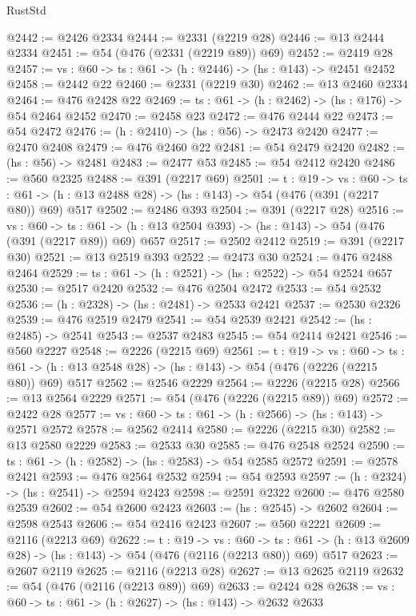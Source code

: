 \begin{lexlean}{RustStd}
\begin{coremodule}
@2442 := @2426 @2334
@2444 := @2331 (@2219 @28)
@2446 := @13 @2444 @2334
@2451 := @54 (@476 (@2331 (@2219 @89)) @69)
@2452 := @2419 @28
@2457 := {vs : @60} -> {ts : @61} -> (h : @2446) -> (hs : @143) -> @2451 @2452
@2458 := @2442 @22
@2460 := @2331 (@2219 @30)
@2462 := @13 @2460 @2334
@2464 := @476 @2428 @22
@2469 := {ts : @61} -> (h : @2462) -> (hs : @176) -> @54 @2464 @2452
@2470 := @2458 @23
@2472 := @476 @2444 @22
@2473 := @54 @2472
@2476 := (h : @2410) -> (hs : @56) -> @2473 @2420
@2477 := @2470 @2408
@2479 := @476 @2460 @22
@2481 := @54 @2479 @2420
@2482 := (hs : @56) -> @2481
@2483 := @2477 @53
@2485 := @54 @2412 @2420
@2486 := @560 @2325
@2488 := @391 (@2217 @69)
@2501 := {t : @19} ->
  {vs : @60} ->
  {ts : @61} -> (h : @13 @2488 @28) -> (hs : @143) -> @54 (@476 (@391 (@2217 @80)) @69) @517
@2502 := @2486 @393
@2504 := @391 (@2217 @28)
@2516 := {vs : @60} ->
  {ts : @61} -> (h : @13 @2504 @393) -> (hs : @143) -> @54 (@476 (@391 (@2217 @89)) @69) @657
@2517 := @2502 @2412
@2519 := @391 (@2217 @30)
@2521 := @13 @2519 @393
@2522 := @2473 @30
@2524 := @476 @2488 @2464
@2529 := {ts : @61} -> (h : @2521) -> (hs : @2522) -> @54 @2524 @657
@2530 := @2517 @2420
@2532 := @476 @2504 @2472
@2533 := @54 @2532
@2536 := (h : @2328) -> (hs : @2481) -> @2533 @2421
@2537 := @2530 @2326
@2539 := @476 @2519 @2479
@2541 := @54 @2539 @2421
@2542 := (hs : @2485) -> @2541
@2543 := @2537 @2483
@2545 := @54 @2414 @2421
@2546 := @560 @2227
@2548 := @2226 (@2215 @69)
@2561 := {t : @19} ->
  {vs : @60} ->
  {ts : @61} -> (h : @13 @2548 @28) -> (hs : @143) -> @54 (@476 (@2226 (@2215 @80)) @69) @517
@2562 := @2546 @2229
@2564 := @2226 (@2215 @28)
@2566 := @13 @2564 @2229
@2571 := @54 (@476 (@2226 (@2215 @89)) @69)
@2572 := @2422 @28
@2577 := {vs : @60} -> {ts : @61} -> (h : @2566) -> (hs : @143) -> @2571 @2572
@2578 := @2562 @2414
@2580 := @2226 (@2215 @30)
@2582 := @13 @2580 @2229
@2583 := @2533 @30
@2585 := @476 @2548 @2524
@2590 := {ts : @61} -> (h : @2582) -> (hs : @2583) -> @54 @2585 @2572
@2591 := @2578 @2421
@2593 := @476 @2564 @2532
@2594 := @54 @2593
@2597 := (h : @2324) -> (hs : @2541) -> @2594 @2423
@2598 := @2591 @2322
@2600 := @476 @2580 @2539
@2602 := @54 @2600 @2423
@2603 := (hs : @2545) -> @2602
@2604 := @2598 @2543
@2606 := @54 @2416 @2423
@2607 := @560 @2221
@2609 := @2116 (@2213 @69)
@2622 := {t : @19} ->
  {vs : @60} ->
  {ts : @61} -> (h : @13 @2609 @28) -> (hs : @143) -> @54 (@476 (@2116 (@2213 @80)) @69) @517
@2623 := @2607 @2119
@2625 := @2116 (@2213 @28)
@2627 := @13 @2625 @2119
@2632 := @54 (@476 (@2116 (@2213 @89)) @69)
@2633 := @2424 @28
@2638 := {vs : @60} -> {ts : @61} -> (h : @2627) -> (hs : @143) -> @2632 @2633

\end{coremodule}
\end{lexlean}
